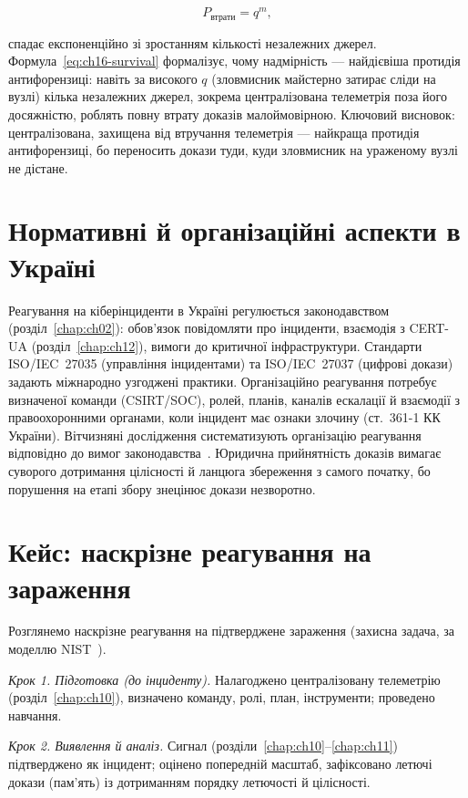 \begin{equation}
P_{\text{втрати}} = q^{m},
\label{eq:ch16-survival}
\end{equation}

спадає експоненційно зі зростанням кількості незалежних джерел. Формула~\eqref{eq:ch16-survival} формалізує, чому надмірність --- найдієвіша протидія антифорензиці: навіть за високого $q$ (зловмисник майстерно затирає сліди на вузлі) кілька незалежних джерел, зокрема централізована телеметрія поза його досяжністю, роблять повну втрату доказів малоймовірною. Ключовий висновок: централізована, захищена від втручання телеметрія --- найкраща протидія антифорензиці, бо переносить докази туди, куди зловмисник на ураженому вузлі не дістане.

\section{Нормативні й організаційні аспекти в Україні}\label{sec:ch16-ukraine}

Реагування на кіберінциденти в Україні регулюється законодавством (розділ~\ref{chap:ch02}): обов'язок повідомляти про інциденти, взаємодія з CERT-UA (розділ~\ref{chap:ch12}), вимоги до критичної інфраструктури. Стандарти ISO/IEC~27035 (управління інцидентами) та ISO/IEC~27037 (цифрові докази) задають міжнародно узгоджені практики. Організаційно реагування потребує визначеної команди (CSIRT/SOC), ролей, планів, каналів ескалації й взаємодії з правоохоронними органами, коли інцидент має ознаки злочину (ст.~361-1 КК України). Вітчизняні дослідження систематизують організацію реагування відповідно до вимог законодавства~\cite{ch16:ir-ua}. Юридична прийнятність доказів вимагає суворого дотримання цілісності й ланцюга збереження з самого початку, бо порушення на етапі збору знецінює докази незворотно.

\section{Кейс: наскрізне реагування на зараження}\label{sec:ch16-case}

Розглянемо наскрізне реагування на підтверджене зараження (захисна задача, за моделлю NIST~\cite{nist-61}).

\emph{Крок 1. Підготовка (до інциденту).} Налагоджено централізовану телеметрію (розділ~\ref{chap:ch10}), визначено команду, ролі, план, інструменти; проведено навчання.

\emph{Крок 2. Виявлення й аналіз.} Сигнал (розділи~\ref{chap:ch10}--\ref{chap:ch11}) підтверджено як інцидент; оцінено попередній масштаб, зафіксовано летючі докази (пам'ять) із дотриманням порядку летючості й цілісності.

